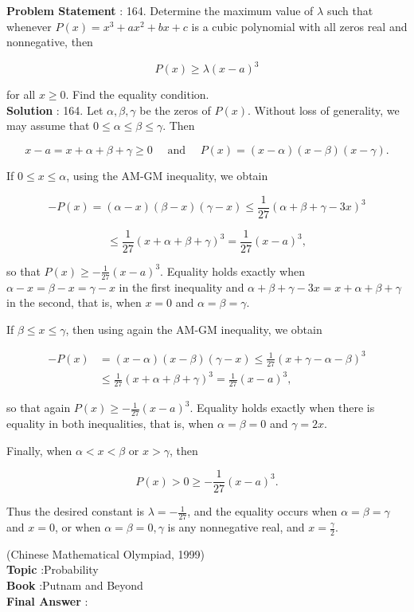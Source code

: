 \documentclass[10pt]{article}
\begin{document}
\textbf{Problem Statement} :
164. Determine the maximum value of $\lambda$ such that whenever $P(x)=x^{3}+a x^{2}+b x+c$ is a cubic polynomial with all zeros real and nonnegative, then

$$
P(x) \geq \lambda(x-a)^{3}
$$

for all $x \geq 0$. Find the equality condition.
\\
\textbf{Solution} :
164. Let $\alpha, \beta, \gamma$ be the zeros of $P(x)$. Without loss of generality, we may assume that $0 \leq \alpha \leq \beta \leq \gamma$. Then

$$
x-a=x+\alpha+\beta+\gamma \geq 0 \quad \text { and } \quad P(x)=(x-\alpha)(x-\beta)(x-\gamma) .
$$

If $0 \leq x \leq \alpha$, using the AM-GM inequality, we obtain

$$
-P(x)=(\alpha-x)(\beta-x)(\gamma-x) \leq \frac{1}{27}(\alpha+\beta+\gamma-3 x)^{3}
$$



$$
\leq \frac{1}{27}(x+\alpha+\beta+\gamma)^{3}=\frac{1}{27}(x-a)^{3},
$$

so that $P(x) \geq-\frac{1}{27}(x-a)^{3}$. Equality holds exactly when $\alpha-x=\beta-x=\gamma-x$ in the first inequality and $\alpha+\beta+\gamma-3 x=x+\alpha+\beta+\gamma$ in the second, that is, when $x=0$ and $\alpha=\beta=\gamma$.

If $\beta \leq x \leq \gamma$, then using again the AM-GM inequality, we obtain

$$
\begin{aligned}
-P(x) &=(x-\alpha)(x-\beta)(\gamma-x) \leq \frac{1}{27}(x+\gamma-\alpha-\beta)^{3} \\
& \leq \frac{1}{27}(x+\alpha+\beta+\gamma)^{3}=\frac{1}{27}(x-a)^{3},
\end{aligned}
$$

so that again $P(x) \geq-\frac{1}{27}(x-a)^{3}$. Equality holds exactly when there is equality in both inequalities, that is, when $\alpha=\beta=0$ and $\gamma=2 x$.

Finally, when $\alpha<x<\beta$ or $x>\gamma$, then

$$
P(x)>0 \geq-\frac{1}{27}(x-a)^{3} .
$$

Thus the desired constant is $\lambda=-\frac{1}{27}$, and the equality occurs when $\alpha=\beta=\gamma$ and $x=0$, or when $\alpha=\beta=0, \gamma$ is any nonnegative real, and $x=\frac{\gamma}{2}$.

(Chinese Mathematical Olympiad, 1999)
\\
\textbf{Topic} :Probability\\
\textbf{Book} :Putnam and Beyond\\
\textbf{Final Answer} :\\
\end{document}
